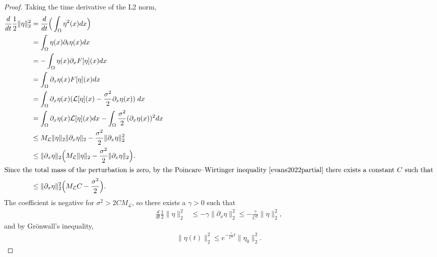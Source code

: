 \documentclass[10pt]{article}
\begin{document}
\begin{proof}
 Taking the time derivative of the L2 norm,
\begin{align*}
    \frac{d}{dt} \frac{1}{2}\|\eta\|^2_2 &= \frac{d}{dt}\Big(\int_\Omega \eta^2(x) dx \Big)\\
    &= \int_\Omega \eta(x)\partial_t\eta(x) dx\\
    &= - \int_\Omega \eta(x) \partial_xF[\eta](x) dx\\
    &=  \int_\Omega \partial_x\eta(x) F[\eta](x) dx\\
     &=  \int_\Omega \partial_x\eta(x) (\mathcal{L}[\eta](x)- \frac{\sigma^2}{2}\partial_x \eta(x))\;dx\\
     &= \int_\Omega \partial_x\eta(x)\mathcal{L}[\eta](x)dx - \int_\Omega\frac{\sigma^2}{2}(\partial_x \eta(x))^2 dx\\
     &\leq  M_{\mathcal{L}}\|\eta\|_2\|\partial_x \eta\|_2 - \frac{\sigma^2}{2}\|\partial_x\eta\|_2^2\\
     &\leq  \|\partial_x \eta\|_2 \Big(M_{\mathcal{L}}\|\eta\|_2- \frac{\sigma^2}{2}\|\partial_x\eta\|_2\Big).\\
     \intertext{Since the total mass of the perturbation is zero, by the Poincare–Wirtinger inequality \cite{evans2022partial} there exists a constant $C$ such that}
     &\leq \|\partial_x \eta\|^2_2 \Big(M_{\mathcal{L}}C- \frac{\sigma^2}{2}\Big).
\end{align*}
The coefficient is negative for $\sigma^2 > 2CM_{\mathcal{L}}$, so there exists a $\gamma >0$ such that 
\begin{align*}
    \frac{d}{dt} \frac{1}{2}\|\eta\|^2_2 &\leq -\gamma\|\partial_x \eta\|^2_2 \leq -\frac{\gamma}{C^2}\|\eta\|_2^2,
\end{align*}
and by Gr\"{o}nwall's inequality,
\begin{align*}
    \|\eta(t)\|^2_2 \leq e^{-\frac{\gamma}{C^2}t} \|\eta_0\|_2^2.
\end{align*}
\end{proof}
\end{document}
